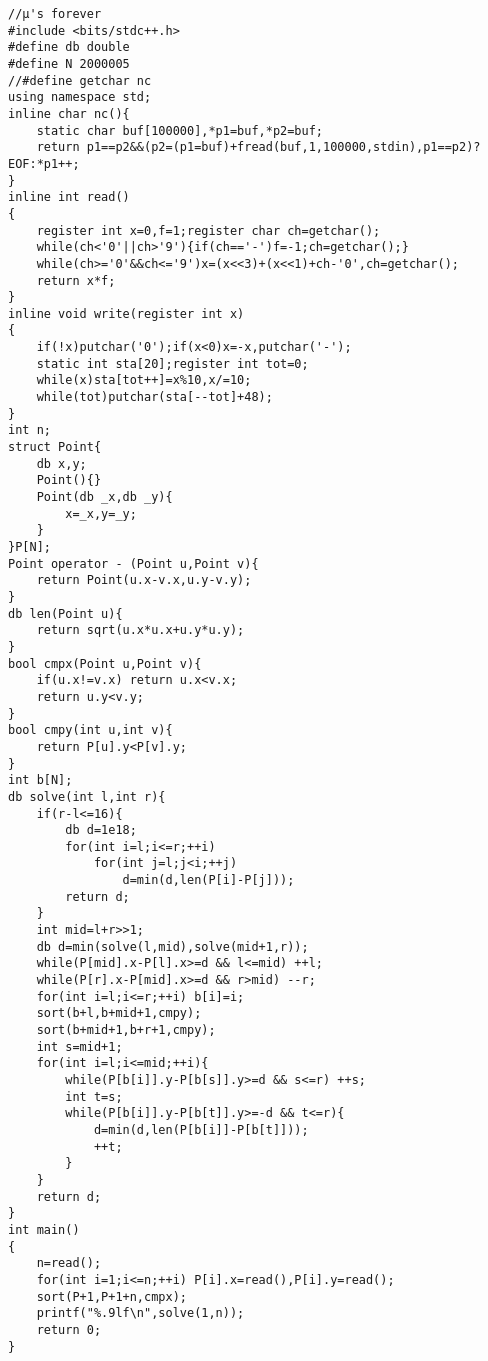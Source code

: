 \begin{verbatim}
//μ's forever
#include <bits/stdc++.h>
#define db double
#define N 2000005
//#define getchar nc
using namespace std;
inline char nc(){
    static char buf[100000],*p1=buf,*p2=buf;
    return p1==p2&&(p2=(p1=buf)+fread(buf,1,100000,stdin),p1==p2)?EOF:*p1++;
}
inline int read()
{
    register int x=0,f=1;register char ch=getchar();
    while(ch<'0'||ch>'9'){if(ch=='-')f=-1;ch=getchar();}
    while(ch>='0'&&ch<='9')x=(x<<3)+(x<<1)+ch-'0',ch=getchar();
    return x*f;
}
inline void write(register int x)
{
    if(!x)putchar('0');if(x<0)x=-x,putchar('-');
    static int sta[20];register int tot=0;
    while(x)sta[tot++]=x%10,x/=10;
    while(tot)putchar(sta[--tot]+48);
}
int n;
struct Point{
    db x,y;
    Point(){}
    Point(db _x,db _y){
        x=_x,y=_y;
    }
}P[N];
Point operator - (Point u,Point v){
    return Point(u.x-v.x,u.y-v.y);
}
db len(Point u){
    return sqrt(u.x*u.x+u.y*u.y);
}
bool cmpx(Point u,Point v){
    if(u.x!=v.x) return u.x<v.x;
    return u.y<v.y;
}
bool cmpy(int u,int v){
    return P[u].y<P[v].y;
}
int b[N];
db solve(int l,int r){
    if(r-l<=16){
        db d=1e18;
        for(int i=l;i<=r;++i)
            for(int j=l;j<i;++j)
                d=min(d,len(P[i]-P[j]));
        return d;
    }
    int mid=l+r>>1;
    db d=min(solve(l,mid),solve(mid+1,r));
    while(P[mid].x-P[l].x>=d && l<=mid) ++l;
    while(P[r].x-P[mid].x>=d && r>mid) --r;
    for(int i=l;i<=r;++i) b[i]=i;
    sort(b+l,b+mid+1,cmpy);
    sort(b+mid+1,b+r+1,cmpy);
    int s=mid+1;
    for(int i=l;i<=mid;++i){
        while(P[b[i]].y-P[b[s]].y>=d && s<=r) ++s;
        int t=s;
        while(P[b[i]].y-P[b[t]].y>=-d && t<=r){
            d=min(d,len(P[b[i]]-P[b[t]]));
            ++t;
        }
    }
    return d;
}
int main()
{
    n=read();
    for(int i=1;i<=n;++i) P[i].x=read(),P[i].y=read();
    sort(P+1,P+1+n,cmpx);
    printf("%.9lf\n",solve(1,n));
    return 0;
}
\end{verbatim}
